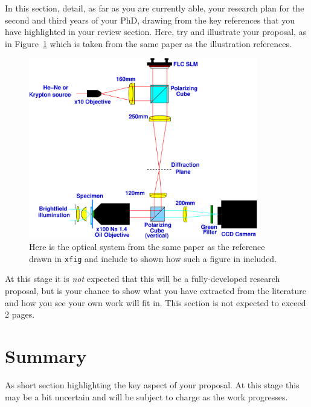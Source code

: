 \documentclass[a4paper,12pt]{article}
\begin{document}
In this section, detail, as far as you are currently able, 
your research plan for the second and third years of your PhD, 
drawing from the key references \cite{jr:block} that you have highlighted in your review section. 
Here, try and illustrate
your proposal, as in Figure~\ref{fig:prism} which is taken from the
same paper as the illustration references.
%
%
\begin{figure}[htb]     %
        \begin{center}
          \includegraphics[width=100mm]{OpticalSystem}
\end{center}
\caption{Here is the optical system from the same paper
  as the reference drawn in {\tt xfig} and include to
  shown how such a figure in included.}
\label{fig:prism}                 %
\end{figure}

At this stage it is {\em not} expected that this will be a fully-developed
research proposal, but is your chance to show what you have extracted from the
literature and how you see your own work will fit in. This section is
not expected to exceed 2 pages.
 
\section{Summary}

As short section highlighting the key aspect of your proposal.
At this stage this may be a bit uncertain and will be subject
to charge as the work progresses.


\end{document}
